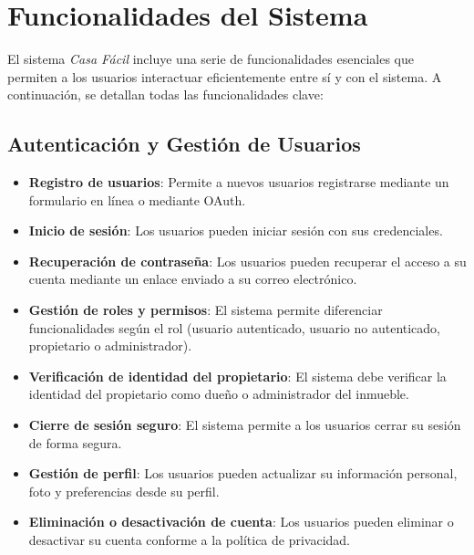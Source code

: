 \section{Funcionalidades del Sistema}
	\noindent El sistema \textit{Casa Fácil} incluye una serie de funcionalidades esenciales que permiten a los usuarios interactuar eficientemente entre sí y con el sistema. A continuación, se detallan todas las funcionalidades clave:
	
	\subsection{Autenticación y Gestión de Usuarios}
		\begin{itemize}
			\item \textbf{Registro de usuarios}: Permite a nuevos usuarios registrarse mediante un formulario en línea o mediante OAuth.
			\item \textbf{Inicio de sesión}: Los usuarios pueden iniciar sesión con sus credenciales.
			\item \textbf{Recuperación de contraseña}: Los usuarios pueden recuperar el acceso a su cuenta mediante un enlace enviado a su correo electrónico.
			\item \textbf{Gestión de roles y permisos}: El sistema permite diferenciar funcionalidades según el rol (usuario autenticado, usuario no autenticado, propietario o administrador).
			\item \textbf{Verificación de identidad del propietario}: El sistema debe verificar la identidad del propietario como dueño o administrador del inmueble.
			\item \textbf{Cierre de sesión seguro}: El sistema permite a los usuarios cerrar su sesión de forma segura.
			\item \textbf{Gestión de perfil}: Los usuarios pueden actualizar su información personal, foto y preferencias desde su perfil.
			\item \textbf{Eliminación o desactivación de cuenta}: Los usuarios pueden eliminar o desactivar su cuenta conforme a la política de privacidad.
		\end{itemize}

